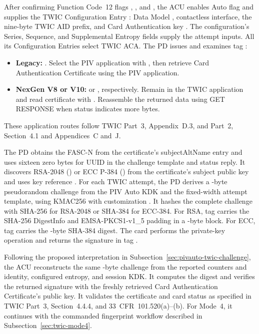 After confirming Function Code~12 flags , , and ,
the ACU enables Auto flag  and supplies the TWIC Configuration Entry
: Data Model , contactless
interface, the nine-byte TWIC AID prefix, and Card Authentication key .
The configuration's Series, Sequence, and Supplemental Entropy fields supply the
attempt inputs. All its Configuration Entries select TWIC ACA.
The PD issues  and examines tag :
\begin{itemize}
  \item \textbf{Legacy:} . Select the PIV
    application with , then retrieve
    Card Authentication Certificate  using the PIV application.
  \item \textbf{NexGen V8 or V10:}  or
    , respectively. Remain in the TWIC
    application and read certificate  with
    . Reassemble the returned data using GET
    RESPONSE when status  indicates more bytes.
\end{itemize}
These application routes follow TWIC Part~3, Appendix~D.3, and Part~2,
Section~4.1 and Appendices~C and~J.

The PD obtains the FASC-N from the certificate's  subjectAltName
entry and uses sixteen zero bytes for UUID in the challenge template and status
reply. It discovers RSA-2048 () or ECC P-384 () from the
certificate's subject public key and uses key reference .
For each TWIC attempt, the PD derives a -byte pseudorandom challenge
from the PIV Auto KDK and the fixed-width attempt template, using KMAC256 with
customization . It hashes the complete challenge
with SHA-256 for RSA-2048 or SHA-384 for ECC-384. For RSA, tag  carries
the SHA-256 DigestInfo and EMSA-PKCS1-v1\_5 padding in a -byte block.
For ECC, tag  carries the -byte SHA-384 digest. The card
performs the private-key operation and returns the signature in tag .

Following the proposed interpretation in Subsection~\ref{sec:pivauto-twic-challenge},
the ACU reconstructs the same -byte challenge from the reported
counters and identity, configured entropy, and session KDK. It computes the digest
and verifies the returned signature with the freshly retrieved Card Authentication
Certificate's public key. It validates the certificate and card status as specified
in TWIC Part~3, Section~4.4.4, and 33~CFR~101.520(a)--(b). For Mode~4, it continues
with the commanded fingerprint workflow described in Subsection~\ref{sec:twic-mode4}.


